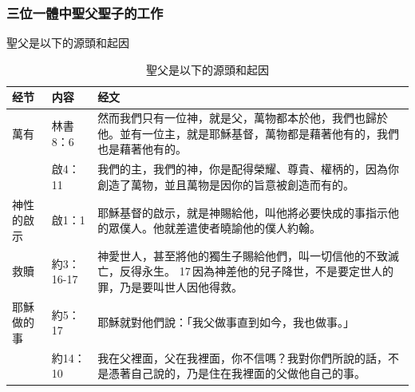 \subsubsection{三位一體中聖父聖子的工作}
聖父是以下的源頭和起因
\begin{table}[H]
\centering
\begin{tabular}{p{5.7em}p{6em}p{33em}}  \toprule
经节&内容&经文 \\  \midrule
萬有&林書8：6&然而我們只有一位神，就是父，萬物都本於他，我們也歸於他。並有一位主，就是耶穌基督，萬物都是藉著他有的，我們也是藉著他有的。\\  \midrule
&啟4：11&我們的主，我們的神，你是配得榮耀、尊貴、權柄的，因為你創造了萬物，並且萬物是因你的旨意被創造而有的。\\  \midrule
神性的啟示&啟1：1&耶穌基督的啟示，就是神賜給他，叫他將必要快成的事指示他的眾僕人。他就差遣使者曉諭他的僕人約翰。\\  \midrule
救贖&約3：16-17&神愛世人，甚至將他的獨生子賜給他們，叫一切信他的不致滅亡，反得永生。 17 因為神差他的兒子降世，不是要定世人的罪，乃是要叫世人因他得救。\\  \midrule
耶穌做的事&約5：17&耶穌就對他們說：「我父做事直到如今，我也做事。」\\  \midrule
&約14：10&我在父裡面，父在我裡面，你不信嗎？我對你們所說的話，不是憑著自己說的，乃是住在我裡面的父做他自己的事。\\  \midrule
\bottomrule
\end{tabular}\caption{聖父是以下的源頭和起因} 
\end{table}



